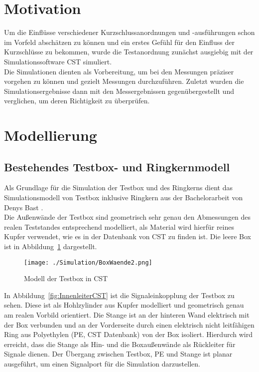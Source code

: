     \section{Motivation}
    Um die Einflüsse verschiedener Kurzschlussanordnungen und -ausführungen schon im Vorfeld abschätzen zu können und ein erstes Gefühl für den Einfluss der Kurzschlüsse zu bekommen, wurde die Testanordnung zunächst ausgiebig mit der Simulationssoftware CST simuliert.\\
    Die Simulationen dienten als Vorbereitung, um bei den Messungen präziser vorgehen zu können und gezielt Messungen durchzuführen. Zuletzt wurden die Simulationsergebnisse dann mit den Messergebnissen gegenübergestellt und verglichen, um deren Richtigkeit zu überprüfen.
    
    \section{Modellierung}
        \subsection{Bestehendes Testbox- und Ringkernmodell}
        Als Grundlage für die Simulation der Testbox und des Ringkerns dient das Simulationsmodell von Testbox inklusive Ringkern aus der Bachelorarbeit von Denys Bast \citep{bast2017ba}.\\
        Die Außenwände der Testbox sind geometrisch sehr genau den Abmessungen des realen Teststandes entsprechend modelliert, als Material wird hierfür reines Kupfer verwendet, wie es in der Datenbank von CST zu finden ist. Die leere Box ist in Abbildung~\ref{fig:BoxCST} dargestellt.
        
            \begin{figure}[htb]
                \centering
                \texttt{[image: ./Simulation/BoxWaende2.png]}
                \caption{Modell der Testbox in CST}
                \label{fig:BoxCST}
            \end{figure}
        In Abbildung~\ref{fig:InnenleiterCST} ist die Signaleinkopplung der Testbox zu sehen.
        Diese ist als Hohlzylinder aus Kupfer modelliert und geometrisch genau am realen Vorbild orientiert. Die Stange ist an der hinteren Wand elektrisch mit der Box verbunden und an der Vorderseite durch einen elektrisch nicht leitfähigen Ring aus Polyethylen (PE, CST Datenbank) von der Box isoliert. Hierdurch wird erreicht, dass die Stange als Hin- und die Boxaußenwände als Rückleiter für Signale dienen. Der Übergang zwischen Testbox, PE und Stange ist planar ausgeführt, um einen Signalport für die Simulation darzustellen.
        
